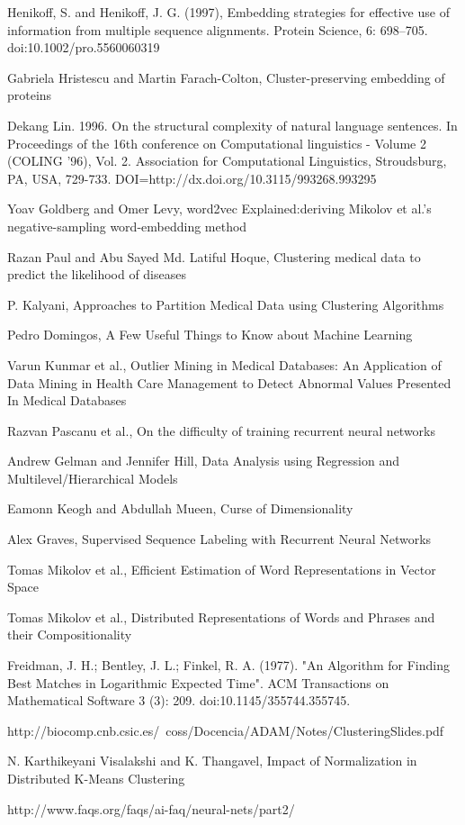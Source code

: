 \documentclass[journal]{IEEETemplate/IEEEtran}
\begin{document}
\begin{thebibliography}{9}

  Henikoff, S. and Henikoff, J. G. (1997), Embedding strategies for effective use of information from multiple sequence alignments. Protein Science, 6: 698–705. doi:10.1002/pro.5560060319
  
	Gabriela Hristescu and Martin Farach-Colton, Cluster-preserving embedding of proteins
	
Dekang Lin. 1996. On the structural complexity of natural language sentences. In Proceedings of the 16th conference on Computational linguistics - Volume 2 (COLING '96), Vol. 2. Association for Computational Linguistics, Stroudsburg, PA, USA, 729-733. DOI=http://dx.doi.org/10.3115/993268.993295

Yoav Goldberg and Omer Levy, word2vec Explained:deriving Mikolov et al.'s negative-sampling word-embedding method

Razan Paul and Abu Sayed Md. Latiful Hoque, Clustering medical data to predict the likelihood of diseases

P. Kalyani, Approaches to Partition Medical Data using Clustering Algorithms

Pedro Domingos, A Few Useful Things to Know about Machine Learning

Varun Kunmar et al., Outlier Mining in Medical Databases: An Application of Data Mining
in Health Care Management to Detect Abnormal Values Presented In
Medical Databases 

Razvan Pascanu et al., On the difficulty of training recurrent neural networks

Andrew Gelman and Jennifer Hill, Data Analysis using Regression and Multilevel/Hierarchical Models


Eamonn Keogh and Abdullah Mueen, Curse of Dimensionality 

Alex Graves, Supervised Sequence Labeling with Recurrent Neural Networks

Tomas Mikolov et al., Efficient Estimation of Word Representations in Vector Space

Tomas Mikolov et al., Distributed Representations of Words and Phrases
and their Compositionality

Freidman, J. H.; Bentley, J. L.; Finkel, R. A. (1977). "An Algorithm for Finding Best Matches in Logarithmic Expected Time". ACM Transactions on Mathematical Software 3 (3): 209. doi:10.1145/355744.355745.

http://biocomp.cnb.csic.es/~coss/Docencia/ADAM/Notes/ClusteringSlides.pdf

N. Karthikeyani Visalakshi and K. Thangavel, Impact of Normalization in Distributed K-Means Clustering

http://www.faqs.org/faqs/ai-faq/neural-nets/part2/

\end{thebibliography}






\end{document}
